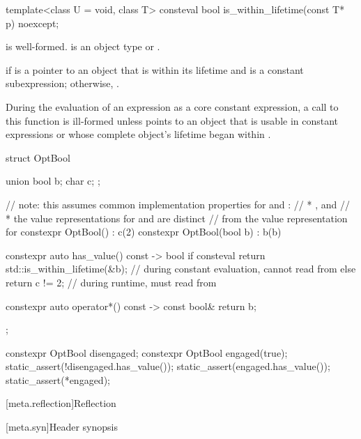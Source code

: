 %
\begin{itemdecl}
template<class U = void, class T>
  consteval bool is_within_lifetime(const T* p) noexcept;
\end{itemdecl}

\begin{itemdescr}
\pnum
\mandates
{} is well-formed.
 is an object type or \cv{} .

\pnum
\returns
{} if  is a pointer to an object that is
within its lifetime and
 is a constant subexpression;
otherwise, .

\pnum
\remarks
During the evaluation of an expression  as a core constant expression,
a call to this function is ill-formed
unless  points to an object that is usable
in constant expressions or
whose complete object's lifetime began within .

\pnum
\begin{example}
\begin{codeblock}
struct OptBool {
  union { bool b; char c; };

  // note: this assumes common implementation properties for  and :
  // * , and
  // * the value representations for  and  are distinct
  //   from the value representation for 
  constexpr OptBool() : c(2) { }
  constexpr OptBool(bool b) : b(b) { }

  constexpr auto has_value() const -> bool {
    if consteval {
      return std::is_within_lifetime(&b);       // during constant evaluation, cannot read from 
    } else {
      return c != 2;                            // during runtime, must read from 
    }
  }

  constexpr auto operator*() const -> const bool& {
    return b;
  }
};

constexpr OptBool disengaged;
constexpr OptBool engaged(true);
static_assert(!disengaged.has_value());
static_assert(engaged.has_value());
static_assert(*engaged);
\end{codeblock}
\end{example}
\end{itemdescr}

[meta.reflection]{Reflection}

[meta.syn]{Header  synopsis}

